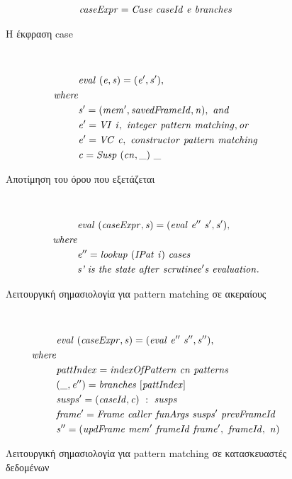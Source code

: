 \documentclass[diploma]{softlab-thesis}
\begin{document}
\begin{figure}[htp]
  \begin{align*}
    \mathit{caseExpr = Case \hfill\ caseId \hfill\ e \hfill\ branches}
  \end{align*}
\caption{Η έκφραση case\label{fig:case-el}}
\end{figure} ~
\begin{figure}[htp]
  \begin{align*}
    &  \mathit{eval \hfill\ (e, s) = (e', s'),}  \\
    \mathit{where} \\
    &  \mathit{s' = (mem', savedFrameId, n), \hfill\ and} \\
    &  \mathit{e' = VI \hfill\ i, \hfill\ integer \hfill\ pattern \hfill\ matching, or} \\
    &  \mathit{e' = VC \hfill\ c, \hfill\ constructor \hfill\ pattern \hfill\ matching} \\
    &  \mathit{c = Susp \hfill\ (cn, \_) \hfill\ \_}  
  \end{align*}
\caption{Αποτίμηση του όρου που εξετάζεται\label{fig:scrueval-el}}
\end{figure} ~
\begin{figure}[htp]
  \begin{align*}
    & \mathit{eval \hfill\ (caseExpr, s) = (eval \hfill\ e'' \hfill\ s', s'),} \\
    \mathit{where} \\
    & \mathit{e'' = lookup \hfill\ (IPat \hfill\ i) \hfill\ cases} \\
    & \mathit{\textit{s'} \hfill\ is \hfill\ the \hfill\ state \hfill\ after \hfill\ scrutinee's 
    \hfill\ evaluation.}
  \end{align*}
\caption{Λειτουργική σημασιολογία για pattern matching σε ακεραίους\label{fig:intPattMatch-el}}
\end{figure} ~
\begin{figure}[htp]
  \begin{align*}
    & \mathit{eval \hfill\ (caseExpr, s) = (eval \hfill\ e'' \hfill\ s'', s''), } \\ 
    \mathit{where} \\
    & \mathit{pattIndex = indexOfPattern \hfill\ cn \hfill\ patterns} \\
    & \mathit{(\_, e'') = branches \hfill\ [pattIndex]} \\
    & \mathit{susps' = (caseId, c) \hfill\ : \hfill\ susps} \\
    & \mathit{frame' = Frame \hfill\ caller \hfill\ funArgs \hfill\ susps' \hfill\ prevFrameId} \\
    & \mathit{s'' = (updFrame \hfill\ mem' \hfill\ frameId \hfill\ frame', \hfill\ frameId, \hfill\ n)}
  \end{align*}
\caption{Λειτουργική σημασιολογία για pattern matching σε κατασκευαστές δεδομένων\label{fig:consPattMatch-el}}
\end{figure}
\end{document}

